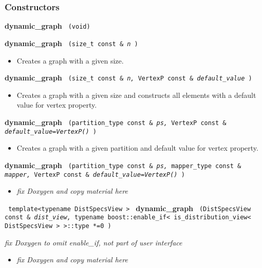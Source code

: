 \subsubsection{Constructors}

\noindent
\textbf{dynamic\_graph}%
\texttt{%
(void)
}
 
\noindent
\textbf{dynamic\_graph}%
\texttt{%
(size\_t const \&
\textit{n}%
)
}

\begin{itemize}
\item
Creates a graph with a given size. 
\end{itemize}
 
\noindent
\textbf{dynamic\_graph}%
\texttt{%
(size\_t const \&
\textit{n,}%
VertexP const \&
\textit{default\_value}%
)
}

\begin{itemize}
\item
Creates a graph with a given size and constructs all elements with a default value for vertex property. 
\end{itemize}
 
\noindent
\textbf{dynamic\_graph}%
\texttt{%
(partition\_type const \&
\textit{ps,}%
VertexP const \& 
\textit{default\_value=VertexP()}%
)
}

\begin{itemize}
\item
Creates a graph with a given partition and default value for vertex property. 
\end{itemize}
 
\noindent
\textbf{dynamic\_graph}%
\texttt{%
(partition\_type const \&
\textit{ps,}%
mapper\_type const \&
\textit{mapper,}%
VertexP const \&
\textit{default\_value=VertexP()}%
)
}

\begin{itemize}
\item
\emph{fix Doxygen and copy material here}
\end{itemize}
 
\noindent
\texttt{%
template<typename DistSpecsView >
}
\newline
\textbf{dynamic\_graph}%
\texttt{%
(DistSpecsView const \&
\textit{dist\_view,}%
typename boost::enable\_if< is\_distribution\_view< DistSpecsView > >::type *=0
)
}

\vspace{0.4cm} \emph{fix Doxygen to omit enable\_if, not part of user interface}
 
\begin{itemize}
\item
\emph{fix Doxygen and copy material here}
\end{itemize}
 
